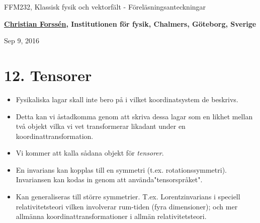 \documentclass[%
oneside,                 %
final,                   %
10pt]{article}
\begin{document}






\thispagestyle{empty}

\begin{center}
{\LARGE\bf
\begin{spacing}{1.25}
FFM232, Klassisk fysik och vektorfält - Föreläsningsanteckningar
\end{spacing}
}
\end{center}


\begin{center}
{\bf \href{{http://fy.chalmers.se/subatom/tsp/}}{Christian Forssén}, Institutionen för fysik, Chalmers, Göteborg, Sverige${}^{}$} \\ [0mm]
\end{center}

\begin{center}
\end{center}
    

\begin{center}
Sep 9, 2016
\end{center}

\vspace{1cm}


\section{12. Tensorer}

\begin{itemize}
\item Fysikaliska lagar skall inte bero på i vilket koordinatsystem de beskrivs.

\item Detta kan vi åstadkomma genom att skriva dessa lagar som en likhet mellan två objekt vilka vi vet transformerar likadant under en koordinattransformation.

\item Vi kommer att kalla sådana objekt för \emph{tensorer}.

\item En invarians kan kopplas till en symmetri (t.ex. rotationssymmetri). Invariansen kan kodas in genom att använda"tensorspråket".

\item Kan generaliseras till större symmetrier. T.ex. Lorentzinvarians i speciell relativitetsteori vilken involverar rum-tiden (fyra dimensioner); och mer allmänna koordinattransformationer i allmän relativitetsteori.
\end{itemize}
\end{document}
